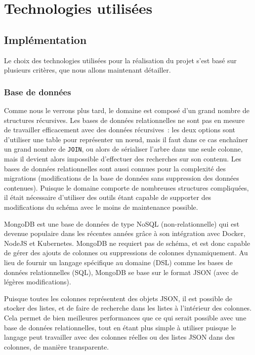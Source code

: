 \section{Technologies utilisées}\label{sec:technologies-utilisees}

\subsection{Implémentation}\label{subsec:livrables-et-developpement}

Le choix des technologies utilisées pour la réalisation du projet s'est basé sur plusieurs critères, que nous allons maintenant détailler.

\subsubsection{Base de données}

Comme nous le verrons plus tard, le domaine est composé d'un grand nombre de structures récursives.
Les bases de données relationnelles ne sont pas en mesure de travailler efficacement avec des données récursives~: les deux options sont d'utiliser une table pour représenter un nœud, mais il faut dans ce cas enchaîner un grand nombre de \lstinline{JOIN}, ou alors de sérialiser l'arbre dans une seule colonne, mais il devient alors impossible d'effectuer des recherches sur son contenu.
Les bases de données relationnelles sont aussi connues pour la complexité des migrations (modifications de la base de données sans suppression des données contenues).
Puisque le domaine comporte de nombreuses structures compliquées, il était nécessaire d'utiliser des outils étant capable de supporter des modifications du schéma avec le moins de maintenance possible.

\uparagraph
MongoDB est une base de données de type NoSQL (non-relationnelle) qui est devenue populaire dans les récentes années grâce à son intégration avec Docker, NodeJS et Kubernetes.
MongoDB ne requiert pas de schéma, et est donc capable de gérer des ajouts de colonnes ou suppressions de colonnes dynamiquement.
Au lieu de fournir un langage spécifique au domaine (DSL) comme les bases de données relationnelles (SQL), MongoDB se base sur le format JSON (avec de légères modifications).

Puisque toutes les colonnes représentent des objets JSON, il est possible de stocker des listes, et de faire de recherche dans les listes à l'intérieur des colonnes.
Cela permet de bien meilleures performances que ce qui serait possible avec une base de données relationnelles, tout en étant plus simple à utiliser puisque le langage peut travailler avec des colonnes réelles ou des listes JSON dans des colonnes, de manière transparente.

